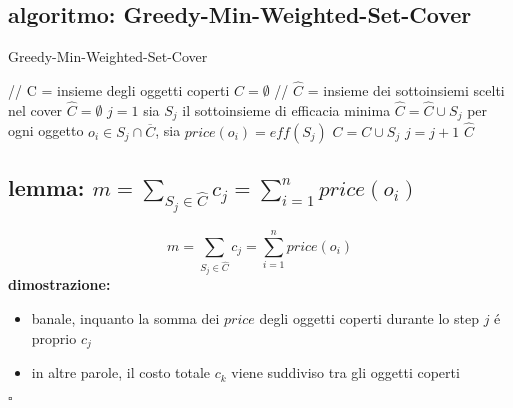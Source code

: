 
\subsection*{algoritmo: Greedy-Min-Weighted-Set-Cover}
\begin{flushleft}
	\begin{algorithm}
		\caption{Greedy-Min-Weighted-Set-Cover}
		\begin{algorithmic}
			\STATE \color{gray} // C = insieme degli oggetti coperti \color{black}
			\STATE $C=\emptyset$
			\STATE \color{gray} // $\hat{C}$ = insieme dei sottoinsiemi scelti nel cover \color{black}
			\STATE $\hat{C}=\emptyset$
			\STATE $j=1$
				\STATE sia $S_j$ il sottoinsieme di efficacia minima
				\STATE $\hat{C}=\hat{C}\cup S_j$
				\STATE per ogni oggetto $o_i\in S_j\cap\overline{C}$, sia $price(o_i)=eff(S_j)$
				\STATE $C=C\cup S_j$
				\STATE $j=j+1$
			\ENDWHILE
			\RETURN $\hat{C}$
		\end{algorithmic}
	\end{algorithm}
\end{flushleft}


\subsection*{lemma: $m=\sum_{S_j\in\hat{C}}c_j=\sum_{i=1}^nprice(o_i)$}
\begin{flushleft}
	$$m=\sum_{S_j\in\hat{C}}c_j=\sum_{i=1}^nprice(o_i)$$
	\textbf{dimostrazione:}
	\begin{itemize}
		\item banale, inquanto la somma dei $price$ degli oggetti coperti durante lo step $j$ \'e proprio $c_j$
		\item in altre parole, il costo totale $c_k$ viene suddiviso tra gli oggetti coperti
	\end{itemize}
	\hfill$\square$
\end{flushleft}


